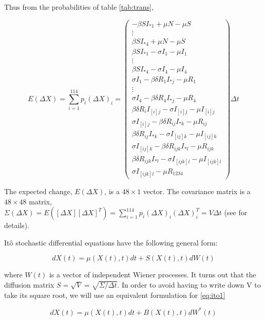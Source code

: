 \documentclass[12pt]{article}
\begin{document}
Thus from the probabilities of table \ref{tab:trans},

\begin{equation}
 E(\Delta X)=\sum_{i=1}^{114} p_i (\Delta X)_i=
\begin{pmatrix}
-\beta S I_{*1} + \mu N -\mu S\\
\vdots\\
\beta S I_{*4} + \mu N -\mu S\\
\beta S I_{*1} -\sigma I_1 -\mu I_1\\
\vdots\\
\beta S I_{*4} -\sigma I_4 -\mu I_4\\
\sigma I_1 - \beta \delta R_1 I_{*j} -\mu R_1\\
\vdots\\
\sigma I_4 - \beta \delta R_4 I_{*j} -\mu R_4\\
\beta \delta R_i I_{[i]j} - \sigma I_{[i]j} -\mu I_{[i]j}\\ 
\sigma I_{[i]j} - \beta \delta R_{ij} I_{*k} - \mu R_{ij}\\
\beta \delta R_{ij} I_{*k} -\sigma I_{[ij]k} -\mu I_{[ij]k}\\ 
\sigma I_{[ij]k} - \beta \delta R_{ijk} I_{*l} -\mu R_{ijk}\\
\beta \delta R_{ijk} I_{*l} - \sigma I_{[ijk]l} - \mu I_{[ijk]l} \\
\sigma I_{[ijk]l} - \mu R_{1234}
\end{pmatrix}
 \Delta t
\end{equation}

The expected change, $E(\Delta X)$, is a $48\times 1$ vector. The covariance 
matrix is a $48\times 48$ matrix, $\Sigma(\Delta X)= E([\Delta X][\Delta X]^T) 
=\sum_{i=1}^{114} p_i (\Delta X)_i (\Delta X)_i^T = V \Delta t$ (see 
\citet{allen_modeling_2007} for details).

Itô stochastic differential equations have the following general form:

\begin{equation}
\label{eq:ito1}
 d X(t) = \mu(X(t),t) dt + S(X(t),t) dW(t)
\end{equation}

where $W(t)$ is a vector of independent Wiener processes. It turns out that the 
diffusion matrix $S=\sqrt{V} = \sqrt{\Sigma/\Delta t}$. In order to avoid 
having to write down V to take its square root, we will use an equivalent 
formulation for \ref{eq:ito1}

\begin{equation}
\label{eq:ito2}
 d X(t) = \mu(X(t),t) dt + B(X(t),t) dW^*(t)
\end{equation}
\end{document}
